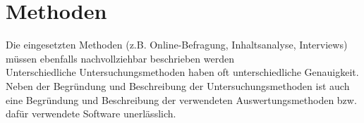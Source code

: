 

\section{Methoden} \label{sec:Methoden}
Die eingesetzten Methoden (z.B. Online-Befragung, Inhaltsanalyse, Interviews) müssen ebenfalls nachvollziehbar
beschrieben werden\\

Unterschiedliche Untersuchungsmethoden haben oft unterschiedliche Genauigkeit.\\

Neben der Begründung und Beschreibung der Untersuchungsmethoden ist auch eine Begründung und Beschreibung der 
verwendeten Auswertungsmethoden bzw. dafür verwendete Software unerlässlich.

